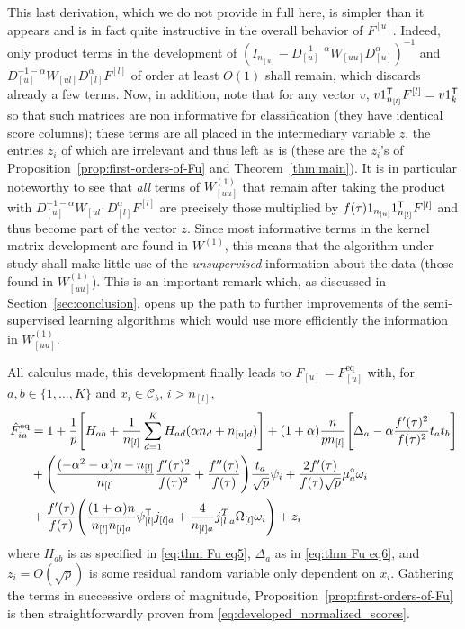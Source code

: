 \documentclass[twoside,11pt]{article}
\def\trans{{\sf T}}
\def\ffftau{f''(\tau)}
\begin{document}
This last derivation, which we do not provide in full here, is simpler than it appears and is in fact quite instructive in the overall behavior of $F^{[u]}$. Indeed, only product terms in the development of $(I_{n_{[u]}}-D_{[u]}^{-1-\alpha}W_{[uu]}D_{[u]}^{\alpha})^{-1}$ and $D_{[u]}^{-1-\alpha}W_{[ul]}D_{[l]}^{\alpha}F^{[l]}$ of order at least $O(1)$ shall remain, which discards already a few terms. Now, in addition, note that for any vector $v$, $v1_{n_{[l]}}^\trans F^{[l]}=v1_k^\trans$ so that such matrices are non informative for classification (they have identical score columns); these terms are all placed in the intermediary variable $z$, the entries $z_i$ of which are irrelevant and thus left as is (these are the $z_i$'s of Proposition~\ref{prop:first-orders-of-Fu} and Theorem~\ref{thm:main}). It is in particular noteworthy to see that {\it all} terms of $W_{[uu]}^{(1)}$ that remain after taking the product with $D_{[u]}^{-1-\alpha}W_{[ul]}D_{[l]}^{\alpha}F^{[l]}$ are precisely those multiplied by $f(\tau)1_{n_{[u]}}1_{n_{[l]}}^\trans F^{[l]}$ and thus become part of the vector $z$. Since most informative terms in the kernel matrix development are found in $W^{(1)}$, this means that the algorithm under study shall make little use of the {\it unsupervised} information about the data (those found in $W_{[uu]}^{(1)}$). This is an important remark which, as discussed in Section~\ref{sec:conclusion}, opens up the path to further improvements of the semi-supervised learning algorithms which would use more efficiently the information in $W_{[uu]}^{(1)}$.


All calculus made, this development finally leads to $F_{[u]}=F_{[u]}^{\text{eq}}$ with, for $a,b\in\{1,\ldots,K\}$ and $x_i\in\mathcal C_b$, $i>n_{[l]}$,
\begin{align}
	\label{eq:developed_normalized_scores}
	\hat{F}_{ia}^{\text{eq}} &=1+\frac{1}{p}\Bigg[H_{ab}+\frac{1}{n_{[l]}}\sum_{d=1}^{K}H_{ad}(\alpha n_{d}+n_{[u]d})\Bigg]+(1+\alpha)\frac{ n}{pn_{[l]}}\Bigg[\Delta_{a}-\alpha\frac{f'(\tau)^2}{f(\tau)^2}t_{a}t_{b}\Bigg]\nonumber\\
	&+\Bigg(\frac{(-\alpha^{2}-\alpha)n-n_{[l]}}{n_{[l]}}\frac{f'(\tau)^{2}}{f(\tau)^{2}}+\frac{\ffftau}{f(\tau)}\Bigg)\frac{t_{a}}{\sqrt{p}}\psi_{i}+\frac{2f'(\tau)}{f(\tau)\sqrt{p}}\mu^{\circ}_{a}\omega_{i}\nonumber\\
	&+\frac{f'(\tau)}{f(\tau)}\Bigg(\frac{(1+\alpha)n}{n_{[l]}n_{[l]a}}\psi_{[l]}^\trans j_{[l]a}+\frac{4}{n_{[l]a}}j_{[l]a}^T\Omega_{[l]}\omega_{i}\Bigg)+z_{i}
\end{align}
where $H_{ab}$ is as specified in \eqref{eq:thm Fu eq5}, $\Delta_{a}$ as in \eqref{eq:thm Fu eq6}, and $z_i=O(\sqrt{p})$ is some residual random variable only dependent on $x_i$. Gathering the terms in successive orders of magnitude, Proposition~\ref{prop:first-orders-of-Fu} is then straightforwardly proven from \eqref{eq:developed_normalized_scores}.
\end{document}
